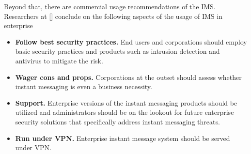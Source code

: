 Beyond that, there are commercial usage recommendations of the IMS\@.
Researchers at [\cite{hindocha2003malicious}] conclude on the following aspects of the usage of IMS in enterprise
\begin{itemize}
    \item \textbf{Follow best security practices.}
    End users and corporations should employ basic security practices and products such as
    intrusion detection and antivirus to mitigate the risk.
    \item \textbf{Wager cons and props.}
    Corporations at the outset should assess whether instant messaging is even a business necessity.
    \item \textbf{Support.} Enterprise versions of
    the instant messaging products should be utilized and administrators should be on the lookout for
    future enterprise security solutions that specifically address instant messaging threats.
    \item \textbf{Run under VPN.} Enterprise instant message system should be served under VPN\@.
\end{itemize}